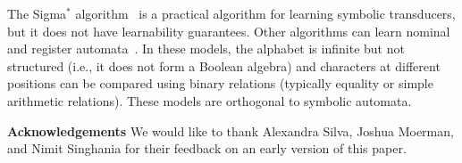 The Sigma$^*$ algorithm~\cite{BotincanB13} is a practical algorithm for learning
symbolic transducers, but it does not have learnability guarantees. 
Other algorithms can learn
nominal~\cite{nominal} and register automata~\cite{Cassel2016}. 
In these models, the alphabet is infinite but not structured (i.e., it does not form a Boolean algebra) 
and characters at different positions can be compared using binary relations
(typically equality or simple arithmetic relations).
These models are orthogonal to symbolic automata.





\noindent\textbf{Acknowledgements}
We would like to thank Alexandra Silva,
Joshua Moerman, and Nimit Singhania
for their feedback on an
early version of this paper.
